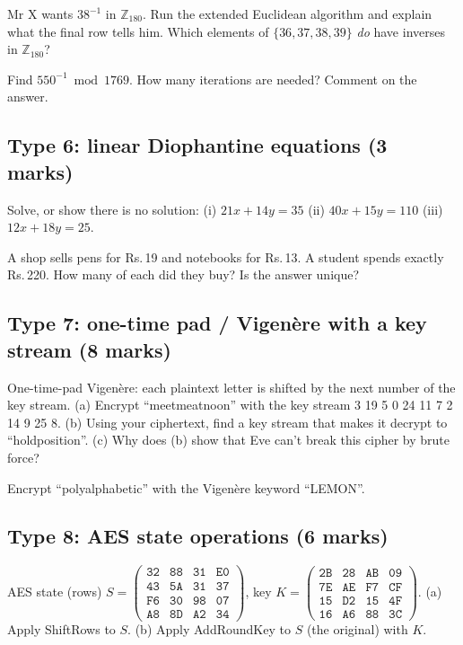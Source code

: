  Mr X wants $38^{-1}$ in $\mathbb{Z}_{180}$. Run the extended Euclidean algorithm and explain what the final row tells him. Which elements of $\{36, 37, 38, 39\}$ \emph{do} have inverses in $\mathbb{Z}_{180}$?

 Find $550^{-1} \bmod 1769$. How many iterations are needed? Comment on the answer.

\subsection*{Type 6: linear Diophantine equations (3 marks)}
 Solve, or show there is no solution: (i) $21x + 14y = 35$ \quad (ii) $40x + 15y = 110$ \quad (iii) $12x + 18y = 25$.

 A shop sells pens for Rs.\,19 and notebooks for Rs.\,13. A student spends exactly Rs.\,220. How many of each did they buy? Is the answer unique?

\subsection*{Type 7: one-time pad / Vigen\`ere with a key stream (8 marks)}
 One-time-pad Vigen\`ere: each plaintext letter is shifted by the next number of the key stream.
(a) Encrypt ``meetmeatnoon'' with the key stream 3 19 5 0 24 11 7 2 14 9 25 8.
(b) Using your ciphertext, find a key stream that makes it decrypt to ``holdposition''.
(c) Why does (b) show that Eve can't break this cipher by brute force?

 Encrypt ``polyalphabetic'' with the Vigen\`ere keyword ``LEMON''.

\subsection*{Type 8: AES state operations (6 marks)}
 AES state (rows) $S = \begin{pmatrix}\mathtt{32}&\mathtt{88}&\mathtt{31}&\mathtt{E0}\\\mathtt{43}&\mathtt{5A}&\mathtt{31}&\mathtt{37}\\\mathtt{F6}&\mathtt{30}&\mathtt{98}&\mathtt{07}\\\mathtt{A8}&\mathtt{8D}&\mathtt{A2}&\mathtt{34}\end{pmatrix}$, key $K = \begin{pmatrix}\mathtt{2B}&\mathtt{28}&\mathtt{AB}&\mathtt{09}\\\mathtt{7E}&\mathtt{AE}&\mathtt{F7}&\mathtt{CF}\\\mathtt{15}&\mathtt{D2}&\mathtt{15}&\mathtt{4F}\\\mathtt{16}&\mathtt{A6}&\mathtt{88}&\mathtt{3C}\end{pmatrix}$.
(a) Apply ShiftRows to $S$. (b) Apply AddRoundKey to $S$ (the original) with $K$.

